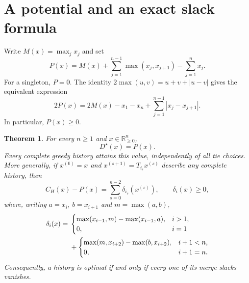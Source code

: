 \documentclass[11pt,a4paper]{article}
\newtheorem{theorem}{Theorem}
\newcommand{\R}{\mathbb R}
\newcommand{\Dstar}{D^{\star}}
\begin{document}
\section{A potential and an exact slack formula}
Write $M(x)=\max_j x_j$ and set
\begin{equation}\label{eq:potential}
 P(x)=M(x)+\sum_{j=1}^{n-1}\max(x_j,x_{j+1})-\sum_{j=1}^n x_j.
\end{equation}
For a singleton, $P=0$. The identity
$2\max(u,v)=u+v+|u-v|$ gives the equivalent expression
\begin{equation}\label{eq:variation}
 2P(x)=2M(x)-x_1-x_n+\sum_{j=1}^{n-1}|x_j-x_{j+1}|.
\end{equation}
In particular, $P(x)\geq0$.

\begin{theorem}\label{thm:main}
For every $n\geq1$ and $x\in\R_{\geq0}^n$,
\[
 \Dstar(x)=P(x).
\]
Every complete greedy history attains this value, independently of all
tie choices. More generally, if $x^{(0)}=x$ and
$x^{(s+1)}=T_{i_s}x^{(s)}$ describe any complete history, then
\begin{equation}\label{eq:regret}
 C_H(x)-P(x)=\sum_{s=0}^{n-2}\delta_{i_s}(x^{(s)}),
 \qquad \delta_i(x)\geq0,
\end{equation}
where, writing $a=x_i$, $b=x_{i+1}$ and $m=\max(a,b)$,
\begin{align}\label{eq:slack}
\delta_i(x)={}&
\begin{cases}
 \max(x_{i-1},m)-\max(x_{i-1},a),& i>1,\\
 0,&i=1
\end{cases}\notag\\
&+\begin{cases}
 \max(m,x_{i+2})-\max(b,x_{i+2}),&i+1<n,\\
 0,&i+1=n.
\end{cases}
\end{align}
Consequently, a history is optimal if and only if every one of its
merge slacks vanishes.
\end{theorem}
\end{document}
